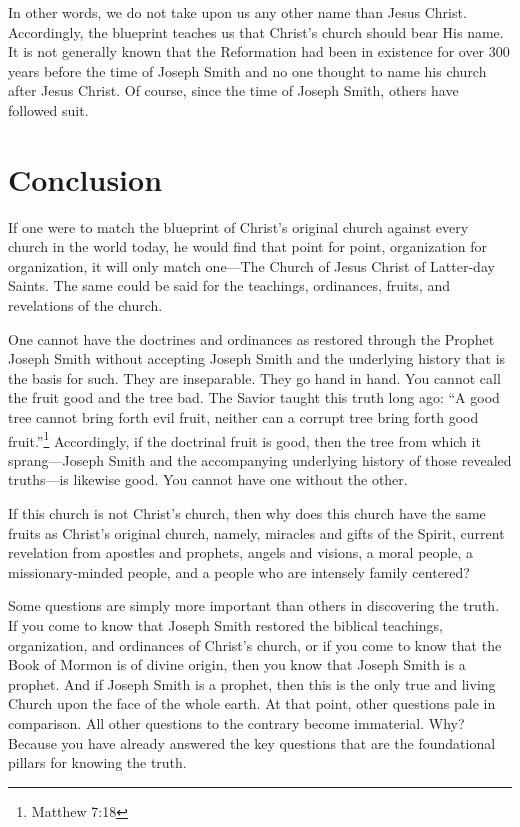 \documentclass{article}
\begin{document}
In other words, we do not take upon us any other name than Jesus Christ. Accordingly, the blueprint teaches us that Christ's church should bear His name. It is not generally known that the Reformation had been in existence for over 300 years before the time of Joseph Smith and no one thought to name his church after Jesus Christ. Of course, since the time of Joseph Smith, others have followed suit.

\section*{Conclusion}
If one were to match the blueprint of Christ's original church against every church in the world today, he would find that point for point, organization for organization, it will only match one---The Church of Jesus Christ of Latter-day Saints. The same could be said for the teachings, ordinances, fruits, and revelations of the church.

One cannot have the doctrines and ordinances as restored through the Prophet Joseph Smith without accepting Joseph Smith and the underlying history that is the basis for such. They are inseparable. They go hand in hand. You cannot call the fruit good and the tree bad. The Savior taught this truth long ago: ``A good tree cannot bring forth evil fruit, neither can a corrupt tree bring forth good fruit.''\footnote{Matthew 7:18} Accordingly, if the doctrinal fruit is good, then the tree from which it sprang---Joseph Smith and the accompanying underlying history of those revealed truths---is likewise good. You cannot have one without the other.

If this church is not Christ's church, then why does this church have the same fruits as Christ's original church, namely, miracles and gifts of the Spirit, current revelation from apostles and prophets, angels and visions, a moral people, a missionary-minded people, and a people who are intensely family centered? 

Some questions are simply more important than others in discovering the truth. If you come to know that Joseph Smith restored the biblical teachings, organization, and ordinances of Christ's church, or if you come to know that the Book of Mormon is of divine origin, then you know that Joseph Smith is a prophet. And if Joseph Smith is a prophet, then this is the only true and living Church upon the face of the whole earth. At that point, other questions pale in comparison. All other questions to the contrary become immaterial. Why? Because you have already answered the key questions that are the foundational pillars for knowing the truth.
\end{document}
